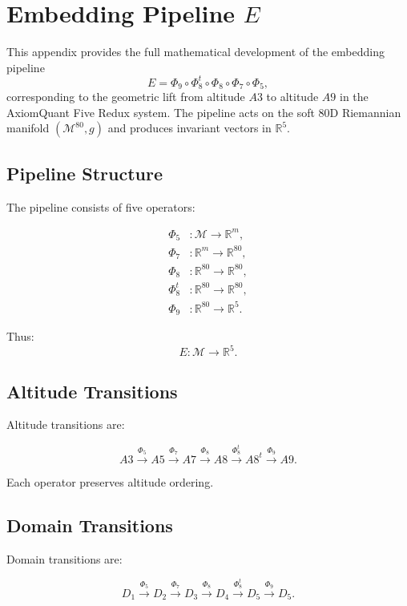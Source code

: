 \section{Embedding Pipeline \texorpdfstring{$E$}{E}}
\label{sec:pipeline}

This appendix provides the full mathematical development of the embedding
pipeline
\[
E = \Phi_9 \circ \Phi_8^t \circ \Phi_8 \circ \Phi_7 \circ \Phi_5,
\]
corresponding to the geometric lift from altitude $A3$ to altitude $A9$ in the
AxiomQuant Five Redux system. The pipeline acts on the soft 80D Riemannian
manifold $(\mathcal{M}^{80}, g)$ and produces invariant vectors in
$\mathbb{R}^5$.

\subsection{Pipeline Structure}

The pipeline consists of five operators:

\[
\begin{aligned}
\Phi_5 &: \mathcal{M} \to \mathbb{R}^m, \\
\Phi_7 &: \mathbb{R}^m \to \mathbb{R}^{80}, \\
\Phi_8 &: \mathbb{R}^{80} \to \mathbb{R}^{80}, \\
\Phi_8^t &: \mathbb{R}^{80} \to \mathbb{R}^{80}, \\
\Phi_9 &: \mathbb{R}^{80} \to \mathbb{R}^5.
\end{aligned}
\]

Thus:
\[
E : \mathcal{M} \to \mathbb{R}^5.
\]

\subsection{Altitude Transitions}

Altitude transitions are:

\[
A3 \xrightarrow{\Phi_5} A5
\xrightarrow{\Phi_7} A7
\xrightarrow{\Phi_8} A8
\xrightarrow{\Phi_8^t} A8^t
\xrightarrow{\Phi_9} A9.
\]

Each operator preserves altitude ordering.

\subsection{Domain Transitions}

Domain transitions are:

\[
D_1 \xrightarrow{\Phi_5} D_2
\xrightarrow{\Phi_7} D_3
\xrightarrow{\Phi_8} D_4
\xrightarrow{\Phi_8^t} D_5
\xrightarrow{\Phi_9} D_5.
\]

